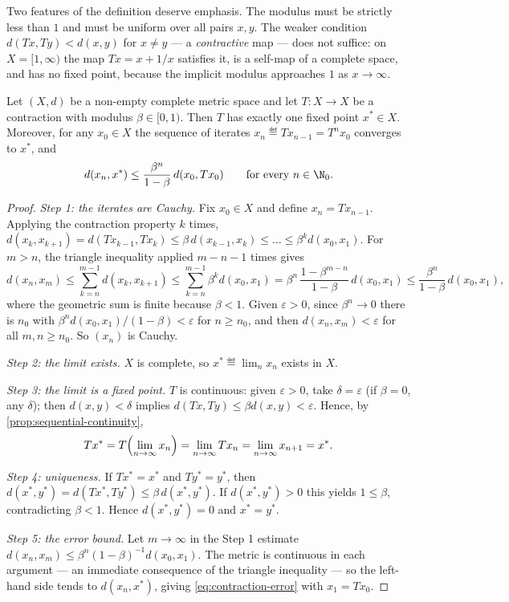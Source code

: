 Two features of the definition deserve emphasis. The modulus must be strictly
less than $1$ and must be uniform over all pairs $x,y$. The weaker condition
$d(Tx,Ty)<d(x,y)$ for $x\neq y$ --- a \emph{contractive} map --- does not
suffice: on $X=[1,\infty)$ the map $Tx=x+1/x$ satisfies it, is a self-map of a
complete space, and has no fixed point, because the implicit modulus approaches
$1$ as $x\to\infty$.

\begin{theorem}\label{thm:banach-fixed-point}
	Let $(X,d)$ be a non-empty complete metric space and let $T\colon X\to X$ be a
	contraction with modulus $\beta\in[0,1)$. Then $T$ has exactly one fixed point
	$x^\ast\in X$. Moreover, for any $x_0\in X$ the sequence of iterates
	$x_n\eqdef Tx_{n-1}=T^nx_0$ converges to $x^\ast$, and
	\begin{equation}\label{eq:contraction-error}
		d(x_n,x^\ast)\leq\frac{\beta^n}{1-\beta}\,d(x_0,Tx_0)
		\qquad\text{for every }n\in\N_0 .
	\end{equation}
\end{theorem}

\begin{proof}
	\emph{Step 1: the iterates are Cauchy.} Fix $x_0\in X$ and define
	$x_n=Tx_{n-1}$. Applying the contraction property $k$ times,
	$d(x_k,x_{k+1})=d(Tx_{k-1},Tx_k)\leq\beta\,d(x_{k-1},x_k)\leq\dots\leq
		\beta^k d(x_0,x_1)$. For $m>n$, the triangle inequality applied $m-n-1$ times
	gives
	\[
		d(x_n,x_m)\leq\sum_{k=n}^{m-1}d(x_k,x_{k+1})
		\leq\sum_{k=n}^{m-1}\beta^kd(x_0,x_1)
		=\beta^n\,\frac{1-\beta^{m-n}}{1-\beta}\,d(x_0,x_1)
		\leq\frac{\beta^n}{1-\beta}\,d(x_0,x_1),
	\]
	where the geometric sum is finite because $\beta<1$. Given $\varepsilon>0$,
	since $\beta^n\to0$ there is $n_0$ with
	$\beta^{n}d(x_0,x_1)/(1-\beta)<\varepsilon$ for $n\geq n_0$, and then
	$d(x_n,x_m)<\varepsilon$ for all $m,n\geq n_0$. So $(x_n)$ is Cauchy.

	\emph{Step 2: the limit exists.} $X$ is complete, so
	$x^\ast\eqdef\lim_nx_n$ exists in $X$.

	\emph{Step 3: the limit is a fixed point.} $T$ is continuous: given
	$\varepsilon>0$, take $\delta=\varepsilon$ (if $\beta=0$, any $\delta$); then
	$d(x,y)<\delta$ implies $d(Tx,Ty)\leq\beta d(x,y)<\varepsilon$. Hence, by
	\autoref{prop:sequential-continuity},
	\[
		Tx^\ast=T\Bigl(\lim_{n\to\infty}x_n\Bigr)=\lim_{n\to\infty}Tx_n
		=\lim_{n\to\infty}x_{n+1}=x^\ast .
	\]

	\emph{Step 4: uniqueness.} If $Tx^\ast=x^\ast$ and $Ty^\ast=y^\ast$, then
	$d(x^\ast,y^\ast)=d(Tx^\ast,Ty^\ast)\leq\beta\,d(x^\ast,y^\ast)$. If
	$d(x^\ast,y^\ast)>0$ this yields $1\leq\beta$, contradicting $\beta<1$. Hence
	$d(x^\ast,y^\ast)=0$ and $x^\ast=y^\ast$.

	\emph{Step 5: the error bound.} Let $m\to\infty$ in the Step 1 estimate
	$d(x_n,x_m)\leq\beta^n(1-\beta)^{-1}d(x_0,x_1)$. The metric is continuous in
	each argument --- an immediate consequence of the triangle inequality --- so the
	left-hand side tends to $d(x_n,x^\ast)$, giving
	\eqref{eq:contraction-error} with $x_1=Tx_0$.
\end{proof}

